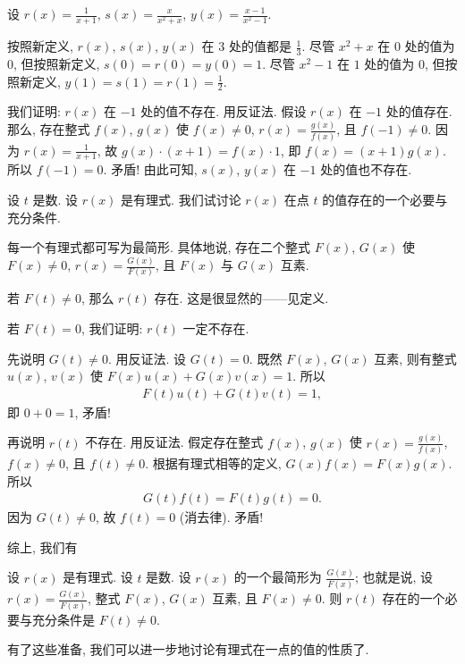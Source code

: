 \begin{example}
    设 $r(x) = \frac{1}{x+1}$, $s(x) = \frac{x}{x^2+x}$, $y(x) = \frac{x-1}{x^2-1}$.

    按照新定义, $r(x)$, $s(x)$, $y(x)$ 在 $3$ 处的值都是 $\frac{1}{3}$. 尽管 $x^2 + x$ 在 $0$ 处的值为 $0$, 但按照新定义, $s(0) = r(0) = y(0) = 1$. 尽管 $x^2 - 1$ 在 $1$ 处的值为 $0$, 但按照新定义, $y(1) = s(1) = r(1) = \frac{1}{2}$.

    我们证明: $r(x)$ 在 $-1$ 处的值不存在. 用反证法. 假设 $r(x)$ 在 $-1$ 处的值存在. 那么, 存在整式 $f(x)$, $g(x)$ 使 $f(x) \neq 0$, $r(x) = \frac{g(x)}{f(x)}$, 且 $f(-1) \neq 0$. 因为 $r(x) = \frac{1}{x+1}$, 故 $g(x) \cdot (x+1) = f(x) \cdot 1$, 即 $f(x) = (x+1) g(x)$. 所以 $f(-1) = 0$. 矛盾! 由此可知, $s(x)$, $y(x)$ 在 $-1$ 处的值也不存在.
\end{example}

设 $t$ 是数. 设 $r(x)$ 是有理式. 我们试讨论 $r(x)$ 在点 $t$ 的值存在的一个必要与充分条件.

每一个有理式都可写为最简形. 具体地说, 存在二个整式 $F(x)$, $G(x)$ 使 $F(x) \neq 0$, $r(x) = \frac{G(x)}{F(x)}$, 且 $F(x)$ 与 $G(x)$ 互素.

若 $F(t) \neq 0$, 那么 $r(t)$ 存在. 这是很显然的——见定义.

若 $F(t) = 0$, 我们证明: $r(t)$ 一定不存在.

先说明 $G(t) \neq 0$. 用反证法. 设 $G(t) = 0$. 既然 $F(x)$, $G(x)$ 互素, 则有整式 $u(x)$, $v(x)$ 使 $F(x) u(x) + G(x) v(x) = 1$. 所以
\begin{align*}
    F(t) u(t) + G(t) v(t) = 1,
\end{align*}
即 $0 + 0 = 1$, 矛盾!

再说明 $r(t)$ 不存在. 用反证法. 假定存在整式 $f(x)$, $g(x)$ 使 $r(x) = \frac{g(x)}{f(x)}$, $f(x) \neq 0$, 且 $f(t) \neq 0$. 根据有理式相等的定义, $G(x) f(x) = F(x) g(x)$. 所以
\begin{align*}
    G(t) f(t) = F(t) g(t) = 0.
\end{align*}
因为 $G(t) \neq 0$, 故 $f(t) = 0$ (消去律). 矛盾!

综上, 我们有
\begin{proposition}
    设 $r(x)$ 是有理式. 设 $t$ 是数. 设 $r(x)$ 的一个最简形为 $\frac{G(x)}{F(x)}$; 也就是说, 设 $r(x) = \frac{G(x)}{F(x)}$, 整式 $F(x)$, $G(x)$ 互素, 且 $F(x) \neq 0$. 则 $r(t)$ 存在的一个必要与充分条件是 $F(t) \neq 0$.
\end{proposition}

有了这些准备, 我们可以进一步地讨论有理式在一点的值的性质了.

